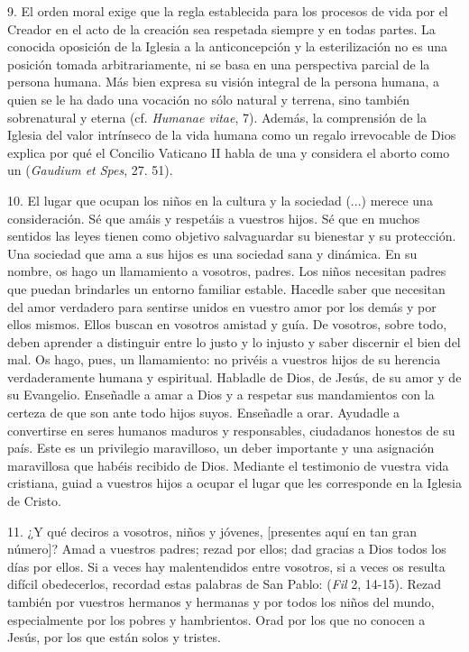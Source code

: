 \begin{body}
\begin{body}
		9. El orden moral exige que la regla establecida para los procesos de vida por el Creador en el acto de la creación sea respetada siempre y en todas partes. La conocida oposición de la Iglesia a la anticoncepción y la esterilización no es una posición tomada arbitrariamente, ni se basa en una perspectiva parcial de la persona humana. Más bien expresa su visión integral de la persona humana, a quien se le ha dado una vocación no sólo natural y terrena, sino también sobrenatural y eterna (cf. \emph{Humanae vitae}, 7). Además, la comprensión de la Iglesia del valor intrínseco de la vida humana como un regalo irrevocable de Dios explica por qué el Concilio Vaticano II habla de una  y considera el aborto como un  (\emph{Gaudium et Spes}, 27. 51).
		
		10. El lugar que ocupan los niños en la cultura y la sociedad (...) merece una consideración. Sé que amáis y respetáis a vuestros hijos. Sé que en muchos sentidos las leyes tienen como objetivo salvaguardar su bienestar y su protección. Una sociedad que ama a sus hijos es una sociedad sana y dinámica. En su nombre, os hago un llamamiento a vosotros, padres. Los niños necesitan padres que puedan brindarles un entorno familiar estable. Hacedle saber que necesitan del amor verdadero para sentirse unidos en vuestro amor por los demás y por ellos mismos. Ellos buscan en vosotros amistad y guía. De vosotros, sobre todo, deben aprender a distinguir entre lo justo y lo injusto y saber discernir el bien del mal. Os hago, pues, un llamamiento: no privéis a vuestros hijos de su herencia verdaderamente humana y espiritual. Habladle de Dios, de Jesús, de su amor y de su Evangelio. Enseñadle a amar a Dios y a respetar sus mandamientos con la certeza de que son ante todo hijos suyos. Enseñadle a orar. Ayudadle a convertirse en seres humanos maduros y responsables, ciudadanos honestos de su país. Este es un privilegio maravilloso, un deber importante y una asignación maravillosa que habéis recibido de Dios. Mediante el testimonio de vuestra vida cristiana, guiad a vuestros hijos a ocupar el lugar que les corresponde en la Iglesia de Cristo.
		
		11. ¿Y qué deciros a vosotros, niños y jóvenes, {[}presentes aquí en tan gran número{]}? Amad a vuestros padres; rezad por ellos; dad gracias a Dios todos los días por ellos. Si a veces hay malentendidos entre vosotros, si a veces os resulta difícil obedecerlos, recordad estas palabras de San Pablo:  (\emph{Fil} 2, 14-15). Rezad también por vuestros hermanos y hermanas y por todos los niños del mundo, especialmente por los pobres y hambrientos. Orad por los que no conocen a Jesús, por los que están solos y tristes.
		

\end{body}
\end{body}
